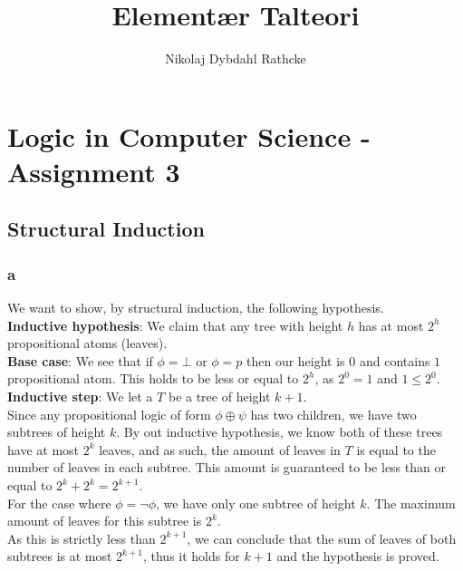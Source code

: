 \documentclass[12pt]{article}
\title{Elementær Talteori}
\author{Nikolaj Dybdahl Rathcke}
\begin{document}
\section*{Logic in Computer Science - Assignment 3}

\subsection*{Structural Induction}
\subsubsection*{a}
We want to show, by structural induction, the following hypothesis.\\
\textbf{Inductive hypothesis}: We claim that any tree with height $h$ has at most $2^h$ propositional atoms (leaves).\\
\textbf{Base case}: We see that if $\phi=\bot$ or $\phi=p$ then our height is $0$ and contains $1$ propositional atom. This holds to be less or equal to $2^h$, as $2^0=1$ and $1\leq 2^0$.\\
\textbf{Inductive step}: We let a $T$ be a tree of height $k+1$.\\
Since any propositional logic of form $\phi\oplus\psi$ has two children, we have two subtrees of height $k$. By out inductive hypothesis, we know both of these trees have at most $2^k$ leaves, and as such, the amount of leaves in $T$ is equal to the number of leaves in each subtree. This amount is guaranteed to be less than or equal to $2^k+2^k=2^{k+1}$.\\
For the case where $\phi=\neg\phi$, we have only one subtree of height $k$. The maximum amount of leaves for this subtree is $2^k$.\\
As this is strictly less than $2^{k+1}$, we can conclude that the sum of leaves of both subtrees is at most $2^{k+1}$, thus it holds for $k+1$ and the hypothesis is proved.
\end{document}
